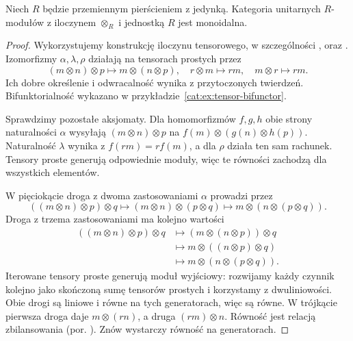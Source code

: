 \begin{twierdzenie}\label{cat:thm:module-monoidal}
Niech $R$ będzie przemiennym pierścieniem z jedynką. Kategoria unitarnych $R$-modułów z iloczynem $\otimes_R$ i jednostką $R$ jest monoidalna.
\end{twierdzenie}
\begin{proof}
Wykorzystujemy konstrukcję iloczynu tensorowego, w szczególności ,  oraz . Izomorfizmy $\alpha,\lambda,\rho$ działają na tensorach prostych przez
\[
(m\otimes n)\otimes p\mapsto m\otimes(n\otimes p),\quad
r\otimes m\mapsto rm,\quad m\otimes r\mapsto rm .
\]
Ich dobre określenie i odwracalność wynika z przytoczonych twierdzeń. Bifunktorialność wykazano w przykładzie~\ref{cat:ex:tensor-bifunctor}.

Sprawdzimy pozostałe aksjomaty. Dla homomorfizmów $f,g,h$ obie strony naturalności $\alpha$ wysyłają $(m\otimes n)\otimes p$ na $f(m)\otimes(g(n)\otimes h(p))$. Naturalność $\lambda$ wynika z $f(rm)=rf(m)$, a dla $\rho$ działa ten sam rachunek. Tensory proste generują odpowiednie moduły, więc te równości zachodzą dla wszystkich elementów.

W pięciokącie droga z dwoma zastosowaniami $\alpha$ prowadzi przez
\[
((m\otimes n)\otimes p)\otimes q
\longmapsto (m\otimes n)\otimes(p\otimes q)
\longmapsto m\otimes(n\otimes(p\otimes q)).
\]
Droga z trzema zastosowaniami ma kolejno wartości
\[
\begin{aligned}
((m\otimes n)\otimes p)\otimes q
&\longmapsto(m\otimes(n\otimes p))\otimes q\\
&\longmapsto m\otimes((n\otimes p)\otimes q)\\
&\longmapsto m\otimes(n\otimes(p\otimes q)).
\end{aligned}
\]
Iterowane tensory proste generują moduł wyjściowy: rozwijamy każdy czynnik kolejno jako skończoną sumę tensorów prostych i korzystamy z dwuliniowości. Obie drogi są liniowe i równe na tych generatorach, więc są równe. W trójkącie pierwsza droga daje $m\otimes(rn)$, a druga $(rm)\otimes n$. Równość jest relacją zbilansowania (por. ). Znów wystarczy równość na generatorach.
\end{proof}

